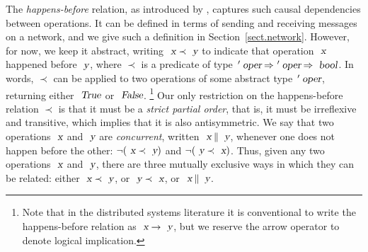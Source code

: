 The \emph{happens-before} relation, as introduced by \citet{Lamport:1978jq}, captures such causal dependencies between operations.
It can be defined in terms of sending and receiving messages on a network, and we give such a definition in Section~\ref{sect.network}.
However, for now, we keep it abstract, writing $\isa{x} \prec \isa{y}$ to indicate that operation $\isa{x}$ happened before $\isa{y}$, where $\prec$ is a predicate of type $\isacharprime\isa{oper} \mathbin{\isasymRightarrow} \isacharprime\isa{oper} \mathbin{\isasymRightarrow} \isa{bool}$.
In words, $\prec$ can be applied to two operations of some abstract type $\isacharprime\isa{oper}$, returning either $\isa{True}$ or $\isa{False}$.%
\footnote{Note that in the distributed systems literature it is conventional to write the happens-before relation as $\isa{x} \rightarrow \isa{y}$, but we reserve the arrow operator to denote logical implication.}
Our only restriction on the happens-before relation $\prec$ is that it must be a \emph{strict partial order}, that is, it must be irreflexive and transitive, which implies that it is also antisymmetric.
We say that two operations $\isa{x}$ and $\isa{y}$ are \emph{concurrent}, written $\isa{x} \mathbin{\isasymparallel} \isa{y}$, whenever one does not happen before the other:
$\neg (\isa{x} \prec \isa{y})$ and $\neg (\isa{y} \prec \isa{x})$.
Thus, given any two operations $\isa{x}$ and $\isa{y}$, there are three mutually exclusive ways in which they can be related: either $\isa{x} \prec \isa{y}$, or $\isa{y} \prec \isa{x}$, or $\isa{x} \mathbin{\isasymparallel} \isa{y}$.

